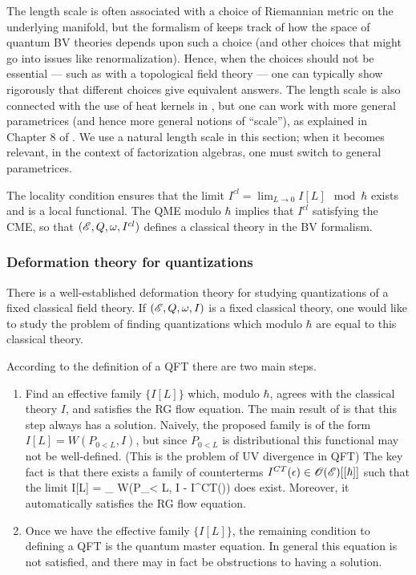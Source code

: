 \begin{rmk}
The length scale is often associated with a choice of Riemannian metric on the underlying manifold,
but the formalism of \cite{CostelloRenormalization} keeps track of how the space of quantum BV theories depends upon such a choice 
(and other choices that might go into issues like renormalization).
Hence, when the choices should not be essential --- such as with a topological field theory --- one can typically show rigorously that different choices give equivalent answers.
The length scale is also connected with the use of heat kernels in \cite{CostelloRenormalization},
but one can work with more general parametrices (and hence more general notions of ``scale''),
as explained in Chapter 8 of \cite{CG2}.
We use a natural length scale in this section; 
when it becomes relevant, in the context of factorization algebras, one must switch to general parametrices.
\end{rmk}

The locality condition ensures that the limit $I^{cl} = \lim_{L \to 0} I[L] \mod \hbar$ exists and is a local functional.
The QME modulo $\hbar$ implies that $I^{cl}$ satisfying the CME, so that $(\mathscr E, Q, \omega, I^{cl})$ defines a classical theory in the BV formalism.

\subsubsection{Deformation theory for quantizations}

There is a well-established deformation theory for studying quantizations of a fixed classical field theory.
If $(\mathscr E, Q, \omega, I)$ is a fixed classical theory, one would like to study the problem of finding quantizations which modulo $\hbar$ are equal to this classical theory. 

According to the definition of a QFT there are two main steps. 

\begin{enumerate}
\item Find an effective family $\{I[L]\}$ which, modulo $\hbar$, agrees with the classical theory $I$, and satisfies the RG flow equation. 
The main result of \cite{CostelloRenormalization} is that this step always has a solution. 
Naively, the proposed family is of the form $I[L] = W(P_{0<L}, I)$, but since $P_{0<L}$ is distributional this functional may not be well-defined. (This is the problem of UV divergence in QFT)
The key fact is that there exists a family of counterterms $I^{CT}(\epsilon) \in \mathscr O(\mathscr E)[[\hbar]]$ such that the limit
\ben
I[L] = \lim_{\epsilon {}} W(P_{\epsilon < L}, I - I^{CT}(\epsilon))
\een
does exist.
Moreover, it automatically satisfies the RG flow equation.
\item Once we have the effective family $\{I[L]\}$, the remaining condition to defining a QFT is the quantum master equation.
In general this equation is not satisfied, and there may in fact be obstructions to having a solution.
\end{enumerate}

